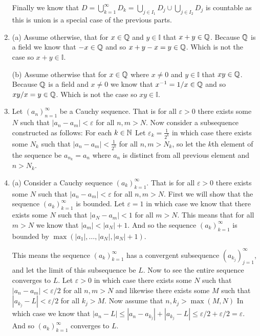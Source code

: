 \documentclass[12pt]{amsart}
\begin{document}
\begin{enumerate}
          Finally we know that $D=\bigcup_{k=1}^{\infty}D_k=\bigcup_{j\in I_1}D_j\cup
              \bigcup_{j\in I_2}D_j$ is countable as this is union is a special case of the
          previous parts.

        
    \item (a) Assume otherwise, that for $x\in\mathbb{Q}$ and $y\in\mathbb{I}$ that $x+y\in\mathbb{Q}$. Because $\mathbb{Q}$ is a field we know that $-x\in\mathbb{Q}$
          and so $x+y-x=y\in\mathbb{Q}$. Which is not the case so $x+y\in\mathbb{I}$.

          
          \noindent(b) Assume otherwise that for $x\in\mathbb{Q}$ where $x\neq 0$ and
          $y\in\mathbb{I}$ that $xy\in\mathbb{Q}$. Because $\mathbb{Q}$ is a field and $x\neq 0$ we know that $x^{-1}=1/x \in\mathbb{Q}$
          and so $xy/x=y\in\mathbb{Q}$. Which is not the case so $xy\in\mathbb{I}$.


    \item Let ${(a_n)}_{n=1}^{\infty}$ be a Cauchy sequence. That is for all
          $\varepsilon>0$ there exists some $N$ such that $|a_n-a_m|<\varepsilon$ for all
          $n,m>N$. Now consider a subsequence constructed as follows: For each $k\in \mathbb{N}$
          Let $\varepsilon_k=\frac{1}{2^k}$ in which case there exists some $N_k$ such
          that $|a_n-a_m|<\frac{1}{2^k}$ for all $n,m>N_k$, so let the $k$th element of
          the sequence be $a_{n_k}=a_n$ where $a_n$ is distinct from all previous element
          and $n>N_k$.


    \item (a) Consider a Cauchy sequence ${(a_k)}_{k=1}^{\infty}$. That is for all $\varepsilon>0$ there exists some $N$
          such that $|a_n-a_m|<\varepsilon$ for all $n,m>N$. First we will show that the sequence $(a_k)_{k=1}^{\infty}$ is bounded.
          Let $\varepsilon=1$ in which case we know that there exists some $N$ such that $|a_N-a_m|<1$ for all $m>N$. This means that
          for all $m>N$ we know that $|a_m|<|a_N|+1$. And so the sequence ${(a_k)}_{k=1}^{\infty}$ is bounded by $\max(|a_1|,\dots,|a_N|,|a_N|+1)$.


          This means the sequence ${(a_k)}_{k=1}^{\infty}$ has a convergent subsequence ${(a_{k_j})}_{j=1}^{\infty}$, and let the limit of this subsequence be $L$.
          Now to see the entire sequence converges to $L$. Let $\varepsilon>0$ in which case there exists some $N$ such that $|a_n-a_m|<\varepsilon/2$
          for all $n,m>N$ and likewise there exists some $M$ such that $|a_{k_j}-L|<\varepsilon/2$ for all $k_j>M$. Now assume that $n,k_j>\max(M,N)$
          In which case we know that $|a_n-L|\leq |a_n-a_{k_j}|+|a_{k_j}-L|\leq \varepsilon/2+\varepsilon/2=\varepsilon$. And so ${(a_k)}_{k=1}^{\infty}$
          converges to $L$.



\end{enumerate}
\end{document}
